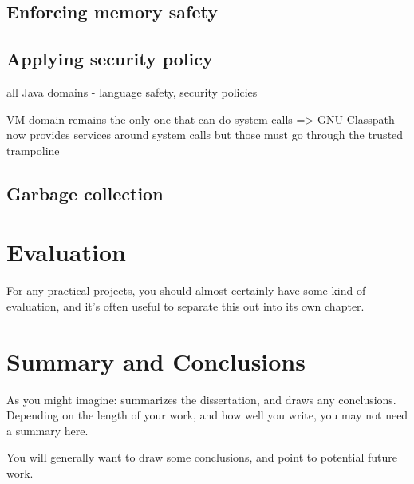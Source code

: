 \documentclass[a4paper,12pt,twoside,openright]{report}
\begin{document}
\section{Enforcing memory safety}

\section{Applying security policy}

all Java domains - language safety, security policies

VM domain remains the only one that can do system calls => GNU Classpath now provides services around system calls but those must go through the trusted trampoline

\section{Garbage collection}

\chapter{Evaluation} 

For any practical projects, you should almost certainly have
some kind of evaluation, and it's often useful to separate 
this out into its own chapter. 


\chapter{Summary and Conclusions} 

As you might imagine: summarizes the dissertation, and draws 
any conclusions. Depending on the length of your work, and 
how well you write, you may not need a summary here. 

You will generally want to draw some conclusions, and point
to potential future work. 




\appendix
\singlespacing

 
 
\end{document}
